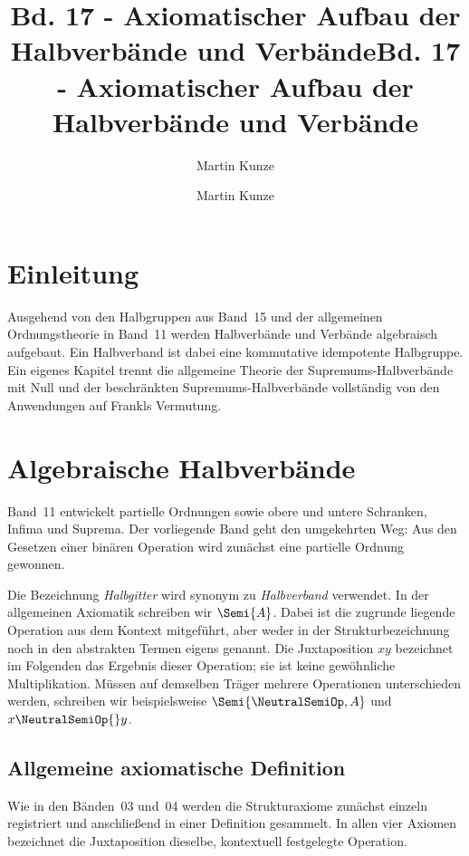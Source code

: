 \documentclass[main.tex]{subfiles}
\title{Bd. 17 - Axiomatischer Aufbau der Halbverbände und Verbände}
\author{Martin Kunze}
\date{}
\begin{document}
\title{Bd. 17 - Axiomatischer Aufbau der Halbverbände und Verbände}
\author{Martin Kunze}
\date{}
\hypersetup{pageanchor=false}
\maketitle
\hypersetup{pageanchor=true}
\setcounter{tocdepth}{3}
\tableofcontents
\setcounter{file}{17}
\renewcommand{\FormulaBandID}{17}

\chapter{Einleitung}

Ausgehend von den Halbgruppen aus Band~15 und der allgemeinen Ordnungstheorie
in Band~11 werden Halbverbände und Verbände algebraisch aufgebaut. Ein
Halbverband ist dabei eine kommutative idempotente Halbgruppe. Ein eigenes
Kapitel trennt
die allgemeine Theorie der Supremums-Halbverbände mit Null und der
beschränkten Supremums-Halbverbände vollständig von den Anwendungen auf
Frankls Vermutung.

\chapter{Algebraische Halbverbände}

Band~11 entwickelt partielle Ordnungen sowie obere und untere Schranken,
Infima und Suprema. Der vorliegende Band geht den umgekehrten Weg: Aus den
Gesetzen einer binären Operation wird zunächst eine partielle Ordnung
gewonnen.

Die Bezeichnung \emph{Halbgitter} wird synonym zu \emph{Halbverband}
verwendet. In der allgemeinen Axiomatik schreiben wir \(\Semi{A}\). Dabei ist
die zugrunde liegende Operation aus dem Kontext mitgeführt, aber weder in der
Strukturbezeichnung noch in den abstrakten Termen eigens genannt. Die
Juxtaposition \(xy\) bezeichnet im Folgenden das Ergebnis dieser Operation;
sie ist keine gewöhnliche Multiplikation. Müssen auf demselben Träger mehrere
Operationen unterschieden werden, schreiben wir beispielsweise
\(\Semi{\NeutralSemiOp,A}\) und \(x\NeutralSemiOp{}y\).

\section{Allgemeine axiomatische Definition}

Wie in den Bänden~03 und~04 werden die Strukturaxiome zunächst einzeln
registriert und anschließend in einer Definition gesammelt. In allen vier
Axiomen bezeichnet die Juxtaposition dieselbe, kontextuell festgelegte
Operation.
\end{document}
